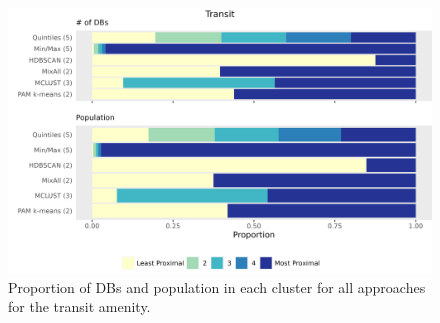 \documentclass[11pt, a4paper]{article}
\begin{document}
\begin{figure}[H]
\centering
\includegraphics[width=\textwidth]{./barplot_comparison/Transit_barplot.png}
\caption[Transit profile barplot]{Proportion of DBs and population in each cluster for all approaches for the transit amenity.}\label{transitbarplot}
\end{figure}
\end{document}
